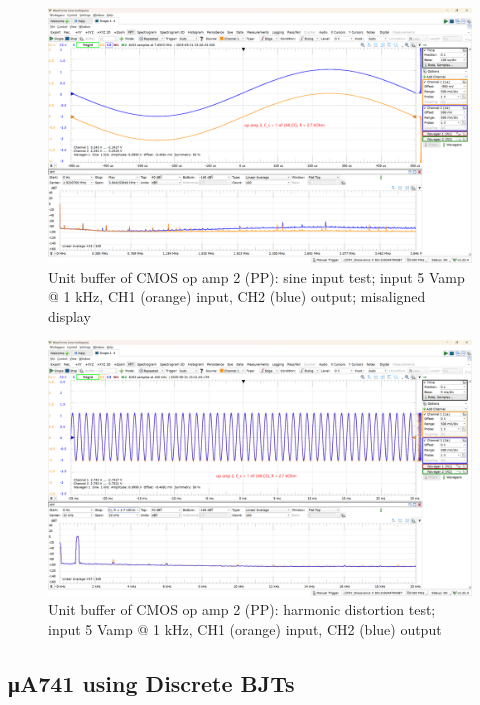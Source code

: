 \documentclass[UTF8]{article}
\begin{document}
\begin{figure}[H]\centering
    \includegraphics[width=\columnwidth]{LCE-06-07-运放设计/assets/op amp 2/unit 2.png}
    \caption{Unit buffer of CMOS op amp 2 (PP): sine input test; input 5 Vamp @ 1 kHz, CH1 (orange) input, CH2 (blue) output; misaligned display}
\end{figure}

\begin{figure}[H]\centering
    \includegraphics[width=\columnwidth]{LCE-06-07-运放设计/assets/op amp 2/unit 3.png}
    \caption{Unit buffer of CMOS op amp 2 (PP): harmonic distortion test; input 5 Vamp @ 1 kHz, CH1 (orange) input, CH2 (blue) output}
\end{figure}

\subsection{μA741 using Discrete BJTs}
\vspace*{-2mm}
\end{document}
